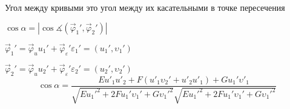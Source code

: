 Угол между кривыми это угол между их касательными в точке пересечения

$\cos \alpha = |\cos \measuredangle (\vec \varphi_1', \vec \varphi_2')|$

$\vec \varphi_1' = \vec \varphi_u u_1' + \vec \varphi_{\varepsilon}'
\varepsilon_1' = (u_1', \upsilon_1')$

$\vec \varphi_2' = \vec \varphi_u u_2' + \vec \varphi_{\varepsilon}'
\varepsilon_2' = (u_2', \upsilon_2')$
$$
\cos \alpha = \frac{Eu'_1 u'_2 + F(u'_1\upsilon_2' + u'_2 u'_1) + Gu_1'
\upsilon'_1}
{\sqrt{Eu_1'^2 + 2Fu_1'\upsilon_1' + G\upsilon_1'^2}
\sqrt{Eu_1'^2 + 2Fu_1'\upsilon_1' + G\upsilon_1'^2}}
$$